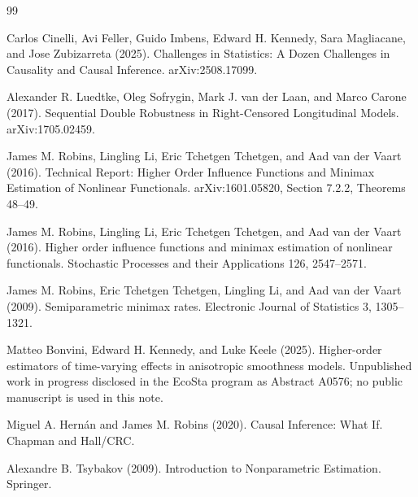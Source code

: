 \documentclass{article}
\begin{document}
\begin{thebibliography}{99}

   Carlos Cinelli, Avi Feller, Guido Imbens, Edward H. Kennedy, Sara Magliacane, and Jose Zubizarreta (2025). Challenges in Statistics: A Dozen Challenges in Causality and Causal Inference. arXiv:2508.17099.

   Alexander R. Luedtke, Oleg Sofrygin, Mark J. van der Laan, and Marco Carone (2017). Sequential Double Robustness in Right-Censored Longitudinal Models. arXiv:1705.02459.

   James M. Robins, Lingling Li, Eric Tchetgen Tchetgen, and Aad van der Vaart (2016). Technical Report: Higher Order Influence Functions and Minimax Estimation of Nonlinear Functionals. arXiv:1601.05820, Section 7.2.2, Theorems 48--49.

   James M. Robins, Lingling Li, Eric Tchetgen Tchetgen, and Aad van der Vaart (2016). Higher order influence functions and minimax estimation of nonlinear functionals. Stochastic Processes and their Applications 126, 2547--2571.

   James M. Robins, Eric Tchetgen Tchetgen, Lingling Li, and Aad van der Vaart (2009). Semiparametric minimax rates. Electronic Journal of Statistics 3, 1305--1321.

   Matteo Bonvini, Edward H. Kennedy, and Luke Keele (2025). Higher-order estimators of time-varying effects in anisotropic smoothness models. Unpublished work in progress disclosed in the EcoSta program as Abstract A0576; no public manuscript is used in this note.

   Miguel A. Hernán and James M. Robins (2020). Causal Inference: What If. Chapman and Hall/CRC.

   Alexandre B. Tsybakov (2009). Introduction to Nonparametric Estimation. Springer.

\end{thebibliography}
\end{document}
